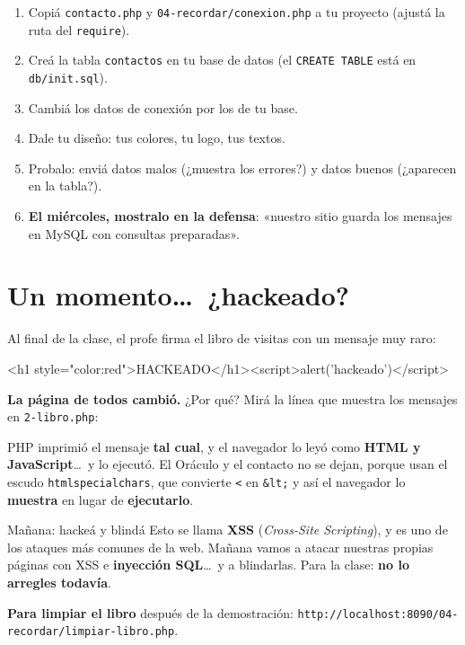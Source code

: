 \begin{reto}
\begin{enumerate}
  \item Copiá \texttt{contacto.php} y \texttt{04-recordar/conexion.php} a tu proyecto (ajustá la ruta del \texttt{require}).
  \item Creá la tabla \texttt{contactos} en tu base de datos (el \texttt{CREATE TABLE} está en \texttt{db/init.sql}).
  \item Cambiá los datos de conexión por los de tu base.
  \item Dale tu diseño: tus colores, tu logo, tus textos.
  \item Probalo: enviá datos malos (¿muestra los errores?) y datos buenos (¿aparecen en la tabla?).
  \item \textbf{El miércoles, mostralo en la defensa}: «nuestro sitio guarda los mensajes en MySQL con consultas preparadas».
\end{enumerate}
\end{reto}

\clearpage
\renewcommand{\seccionactual}{¿HACKEADO?}
\section*{Un momento\ldots\ ¿hackeado?}

Al final de la clase, el profe firma el libro de visitas con un mensaje muy raro:
\begin{salida}
<h1 style="color:red">HACKEADO</h1><script>alert('hackeado')</script>
\end{salida}
\textbf{La página de todos cambió.} ¿Por qué? Mirá la línea que muestra los mensajes en \texttt{2-libro.php}:
PHP imprimió el mensaje \textbf{tal cual}, y el navegador lo leyó como \textbf{HTML y JavaScript}\ldots\ y lo ejecutó.
El Oráculo y el contacto no se dejan, porque usan el escudo \texttt{htmlspecialchars}, que convierte \texttt{<} en \texttt{\&lt;}
y así el navegador lo \textbf{muestra} en lugar de \textbf{ejecutarlo}.

\begin{marco}[brasa]{Mañana: hackeá y blindá}
Esto se llama \textbf{XSS} (\emph{Cross-Site Scripting}), y es uno de los ataques más comunes de la web. Mañana vamos a atacar
nuestras propias páginas con XSS e \textbf{inyección SQL}\ldots\ y a blindarlas. Para la clase: \textbf{no lo arregles todavía}.
\end{marco}
\vspace{2mm}
\textbf{Para limpiar el libro} después de la demostración: \texttt{http://localhost:8090/04-recordar/limpiar-libro.php}.
